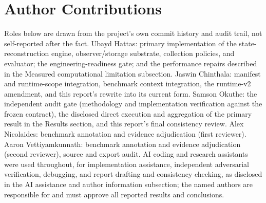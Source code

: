 \documentclass[11pt]{article}
\begin{document}
\section*{Author Contributions}
Roles below are drawn from the project's own commit history and audit trail, not self-reported after the fact. Ubayd Hattas: primary implementation of the state-reconstruction engine, observer/storage substrate, collection policies, and evaluator; the engineering-readiness gate; and the performance repairs described in the Measured computational limitation subsection. Jaswin Chinthala: manifest and runtime-scope integration, benchmark context integration, the runtime-v2 amendment, and this report's rewrite into its current form. Samson Okuthe: the independent audit gate (methodology and implementation verification against the frozen contract), the disclosed direct execution and aggregation of the primary result in the Results section, and this report's final consistency review. Alex Nicolaides: benchmark annotation and evidence adjudication (first reviewer). Aaron Vettiyamkunnath: benchmark annotation and evidence adjudication (second reviewer), source and export audit. AI coding and research assistants were used throughout, for implementation assistance, independent adversarial verification, debugging, and report drafting and consistency checking, as disclosed in the AI assistance and author information subsection; the named authors are responsible for and must approve all reported results and conclusions.
\end{document}
